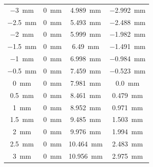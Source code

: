 \begin{table}[ht]
\begin{tabular}{| c | c | c | c |}
        \SI{-3}{mm}           & \SI{0}{mm}     & \SI{4.989}{mm}      & \SI{-2.992}{mm}   \\
        \SI{-2.5}{mm}         & \SI{0}{mm}     & \SI{5.493}{mm}      & \SI{-2.488}{mm}   \\
        \SI{-2}{mm}           & \SI{0}{mm}     & \SI{5.999}{mm}      & \SI{-1.982}{mm}   \\
        \SI{-1.5}{mm}         & \SI{0}{mm}     & \SI{6.49}{mm}       & \SI{-1.491}{mm}   \\
        \SI{-1}{mm}           & \SI{0}{mm}     & \SI{6.998}{mm}      & \SI{-0.984}{mm}   \\
        \SI{-0.5}{mm}         & \SI{0}{mm}     & \SI{7.459}{mm}      & \SI{-0.523}{mm}   \\
        \SI{0}{mm}            & \SI{0}{mm}     & \SI{7.981}{mm}      & \SI{0.0}{mm}      \\
        \SI{0.5}{mm}          & \SI{0}{mm}     & \SI{8.461}{mm}      & \SI{0.479}{mm}    \\
        \SI{1}{mm}            & \SI{0}{mm}     & \SI{8.952}{mm}      & \SI{0.971}{mm}    \\
        \SI{1.5}{mm}          & \SI{0}{mm}     & \SI{9.485}{mm}      & \SI{1.503}{mm}    \\
        \SI{2}{mm}            & \SI{0}{mm}     & \SI{9.976}{mm}      & \SI{1.994}{mm}    \\
        \SI{2.5}{mm}          & \SI{0}{mm}     & \SI{10.464}{mm}     & \SI{2.483}{mm}    \\
        \SI{3}{mm}            & \SI{0}{mm}     & \SI{10.956}{mm}     & \SI{2.975}{mm}    \\

        \hline



\end{tabular}
\end{table}

